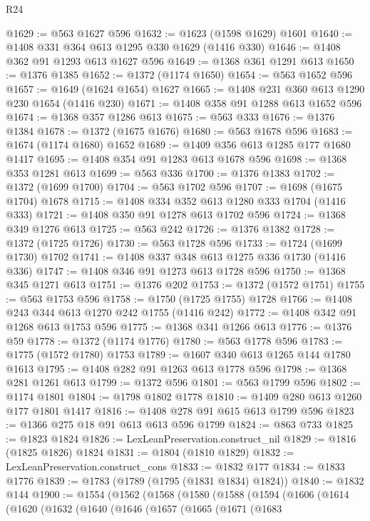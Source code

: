 \begin{lexlean}{R24}
\begin{coremodule}
@1629 := @563 @1627 @596
@1632 := @1623 (@1598 @1629) @1601
@1640 := @1408 @331 @364 @613 @1295 @330 @1629 (@1416 @330)
@1646 := @1408 @362 @91 @1293 @613 @1627 @596
@1649 := @1368 @361 @1291 @613
@1650 := @1376 @1385
@1652 := @1372 (@1174 @1650)
@1654 := @563 @1652 @596
@1657 := @1649 (@1624 @1654) @1627
@1665 := @1408 @231 @360 @613 @1290 @230 @1654 (@1416 @230)
@1671 := @1408 @358 @91 @1288 @613 @1652 @596
@1674 := @1368 @357 @1286 @613
@1675 := @563 @333
@1676 := @1376 @1384
@1678 := @1372 (@1675 @1676)
@1680 := @563 @1678 @596
@1683 := @1674 (@1174 @1680) @1652
@1689 := @1409 @356 @613 @1285 @177 @1680 @1417
@1695 := @1408 @354 @91 @1283 @613 @1678 @596
@1698 := @1368 @353 @1281 @613
@1699 := @563 @336
@1700 := @1376 @1383
@1702 := @1372 (@1699 @1700)
@1704 := @563 @1702 @596
@1707 := @1698 (@1675 @1704) @1678
@1715 := @1408 @334 @352 @613 @1280 @333 @1704 (@1416 @333)
@1721 := @1408 @350 @91 @1278 @613 @1702 @596
@1724 := @1368 @349 @1276 @613
@1725 := @563 @242
@1726 := @1376 @1382
@1728 := @1372 (@1725 @1726)
@1730 := @563 @1728 @596
@1733 := @1724 (@1699 @1730) @1702
@1741 := @1408 @337 @348 @613 @1275 @336 @1730 (@1416 @336)
@1747 := @1408 @346 @91 @1273 @613 @1728 @596
@1750 := @1368 @345 @1271 @613
@1751 := @1376 @202
@1753 := @1372 (@1572 @1751)
@1755 := @563 @1753 @596
@1758 := @1750 (@1725 @1755) @1728
@1766 := @1408 @243 @344 @613 @1270 @242 @1755 (@1416 @242)
@1772 := @1408 @342 @91 @1268 @613 @1753 @596
@1775 := @1368 @341 @1266 @613
@1776 := @1376 @59
@1778 := @1372 (@1174 @1776)
@1780 := @563 @1778 @596
@1783 := @1775 (@1572 @1780) @1753
@1789 := @1607 @340 @613 @1265 @144 @1780 @1613
@1795 := @1408 @282 @91 @1263 @613 @1778 @596
@1798 := @1368 @281 @1261 @613
@1799 := @1372 @596
@1801 := @563 @1799 @596
@1802 := @1174 @1801
@1804 := @1798 @1802 @1778
@1810 := @1409 @280 @613 @1260 @177 @1801 @1417
@1816 := @1408 @278 @91 @615 @613 @1799 @596
@1823 := @1366 @275 @18 @91 @613 @613 @596 @1799
@1824 := @863 @733
@1825 := @1823 @1824
@1826 := LexLeanPreservation.construct_nil
@1829 := @1816 (@1825 @1826) @1824
@1831 := @1804 (@1810 @1829)
@1832 := LexLeanPreservation.construct_cons
@1833 := @1832 @177
@1834 := @1833 @1776
@1839 := @1783 (@1789 (@1795 (@1831 @1834) @1824))
@1840 := @1832 @144
@1900 := @1554
    (@1562
      (@1568
        (@1580
          (@1588
            (@1594
              (@1606
                (@1614
                  (@1620
                    (@1632
                      (@1640
                        (@1646
                          (@1657
                            (@1665
                              (@1671
                                (@1683

\end{coremodule}
\end{lexlean}
